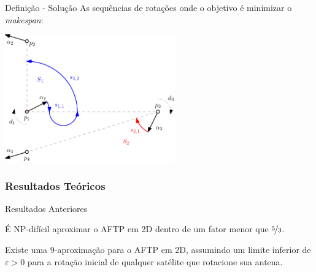 \begin{frame}{Definição - Solução}
  As sequências de rotações onde o objetivo é minimizar o \emph{makespan}:

  \pause

  \bigskip
  \begin{minipage}{\linewidth}
    \centering
    \includegraphics[height=5.5cm]{AFTP/solution.png}
  \end{minipage}
\end{frame}


\subsubsection{Resultados Teóricos}

\begin{frame}{Resultados Anteriores}
  \begin{thm}
    É NP-difícil aproximar o AFTP em 2D dentro de um fator menor que $\nicefrac{5}{3}$.
  \end{thm}

  \pause

  \begin{thm}
    Existe uma $9$-aproximação para o AFTP em 2D, assumindo um limite inferior de $\varepsilon>0$ para a rotação inicial de qualquer satélite que rotacione sua antena.
  \end{thm}
\end{frame}

